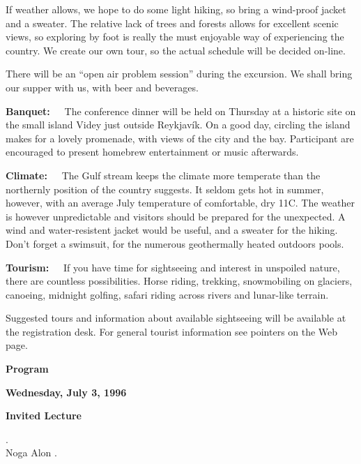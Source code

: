 If weather allows, we hope to do some light hiking, so bring a
wind-proof jacket and a sweater. The relative lack of trees and
forests allows for excellent scenic views, so exploring by foot is
really the must enjoyable way of experiencing the country.
We create our own tour, so the actual schedule will be decided on-line.

There will be an ``open air problem session'' during the excursion.
We shall bring our supper with us, with beer and beverages.

{\bf Banquet:\ \ }
The conference dinner will be held on Thursday at a historic site on
the small island Videy just outside Reykjav\'ik. On a good day,
circling the island makes for a lovely promenade, with views of the
city and the bay. Participant are encouraged to present homebrew entertainment
or music afterwards.


{\bf Climate:\ \ }
The Gulf stream keeps the climate more temperate than the northernly
position of the country suggests. It seldom gets hot in summer,
however, with an average July temperature of comfortable, dry 11C.
The weather is however unpredictable and visitors should be prepared
for the unexpected. A wind and water-resistent jacket would be useful,
and a sweater for the hiking. Don't forget a swimsuit, for the numerous
geothermally heated outdoors pools.

{\bf Tourism:\ \ }
If you have time for sightseeing and interest in unspoiled nature,
there are countless possibilities. Horse riding, trekking,
snowmobiling on glaciers, canoeing, midnight golfing, safari riding
across rivers and lunar-like terrain.

Suggested tours and information about available sightseeing will be
available at the registration desk. 
For general tourist information see pointers on the Web page.


\newpage

\begin{center}
 
{\normalsize\bf Program}

\end{center}
\parskip=4pt
\parindent=0pt

{\normalsize\bf Wednesday, July 3, 1996}

{\bf Invited Lecture}
\begin{session}

\item[9:00]
. \\
{\who Noga Alon}
.
\end{session}

